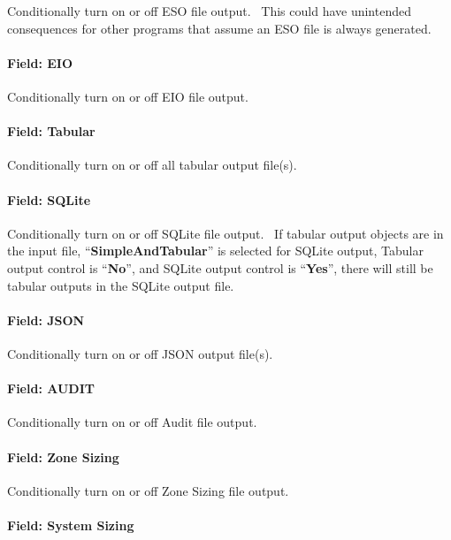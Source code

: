 Conditionally turn on or off ESO file output.~ This could have unintended consequences for other programs that assume an ESO file is always generated.

\paragraph{Field: EIO}\label{field-eio}

Conditionally turn on or off EIO file output.

\paragraph{Field: Tabular}\label{field-tabular}

Conditionally turn on or off all tabular output file(s).

\paragraph{Field: SQLite}\label{field-sqlite}

Conditionally turn on or off SQLite file output.~ If tabular output objects are in the input file, ``\textbf{SimpleAndTabular}'' is selected for SQLite output, Tabular output control is ``\textbf{No}'', and SQLite output control is ``\textbf{Yes}'', there will still be tabular outputs in the SQLite output file.

\paragraph{Field: JSON}\label{field-json}

Conditionally turn on or off JSON output file(s).

\paragraph{Field: AUDIT}\label{field-audit}

Conditionally turn on or off Audit file output.

\paragraph{Field: Zone Sizing}\label{field-zone-sizing}

Conditionally turn on or off Zone Sizing file output.

\paragraph{Field: System Sizing}\label{field-system-sizing}

